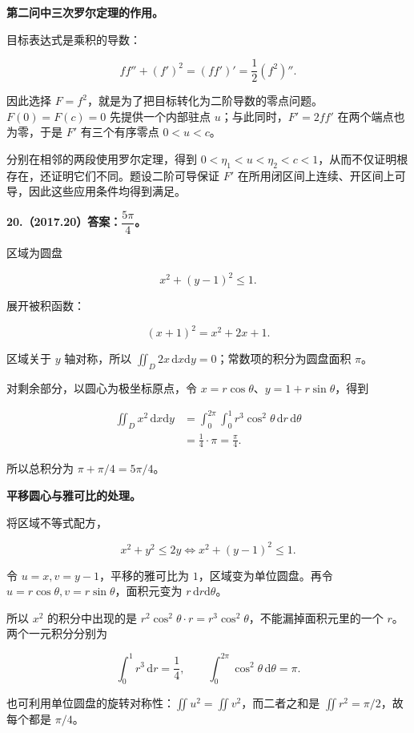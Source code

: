 \documentclass[UTF8,11pt,fontset=windows]{ctexart}
\begin{document}
\textbf{第二问中三次罗尔定理的作用。}

目标表达式是乘积的导数：

$$
f f''+(f')^2=(f f')'=\frac12(f^2)''.
$$

因此选择 $F=f^2$，就是为了把目标转化为二阶导数的零点问题。$F(0)=F(c)=0$ 先提供一个内部驻点 $u$；与此同时，$F'=2ff'$ 在两个端点也为零，于是 $F'$ 有三个有序零点 $0<u<c$。

分别在相邻的两段使用罗尔定理，得到 $0<\eta_1<u<\eta_2<c<1$，从而不仅证明根存在，还证明它们不同。题设二阶可导保证 $F'$ 在所用闭区间上连续、开区间上可导，因此这些应用条件均得到满足。

\clearpage

\textbf{20.（2017.20）答案：$\dfrac{5\pi}{4}$。}

区域为圆盘

$$
x^2+(y-1)^2\le1.
$$

展开被积函数：

$$
(x+1)^2=x^2+2x+1.
$$

区域关于 $y$ 轴对称，所以 $\iint_D2x\,\mathrm dx\mathrm dy=0$；常数项的积分为圆盘面积 $\pi$。

对剩余部分，以圆心为极坐标原点，令 $x=r\cos\theta$、$y=1+r\sin\theta$，得到

$$
\begin{aligned}
\iint_Dx^2\,\mathrm dx\mathrm dy
&=\int_0^{2\pi}\int_0^1r^3\cos^2\theta\,\mathrm dr\,\mathrm d\theta\\
&=\frac14\cdot\pi=\frac\pi4.
\end{aligned}
$$

所以总积分为 $\pi+\pi/4=5\pi/4$。

\textbf{平移圆心与雅可比的处理。}

将区域不等式配方，

$$
x^2+y^2\le2y
\iff x^2+(y-1)^2\le1.
$$

令 $u=x,v=y-1$，平移的雅可比为 $1$，区域变为单位圆盘。再令 $u=r\cos\theta,v=r\sin\theta$，面积元变为 $r\,\mathrm dr\mathrm d\theta$。

所以 $x^2$ 的积分中出现的是 $r^2\cos^2\theta\cdot r=r^3\cos^2\theta$，不能漏掉面积元里的一个 $r$。两个一元积分分别为

$$
\int_0^1r^3\,\mathrm dr=\frac14,
\qquad
\int_0^{2\pi}\cos^2\theta\,\mathrm d\theta=\pi.
$$

也可利用单位圆盘的旋转对称性：$\iint u^2=\iint v^2$，而二者之和是 $\iint r^2=\pi/2$，故每个都是 $\pi/4$。
\end{document}
